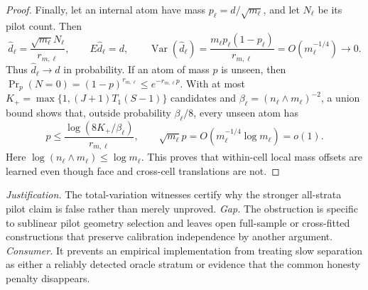 \documentclass{article}
\begin{document}
\begin{proof}
Finally, let an internal atom have mass \(p_\ell=d/\sqrt{m_\ell}\), and let \(N_\ell\) be its pilot count.  Then
\[
 \widehat d_\ell=\frac{\sqrt{m_\ell}N_\ell}{r_{m,\ell}},
 \qquad
 E\widehat d_\ell=d,
 \qquad
 \operatorname{Var}(\widehat d_\ell)
 =\frac{m_\ell p_\ell(1-p_\ell)}{r_{m,\ell}}
 =O(m_\ell^{-1/4})\to0.
\]
Thus \(\widehat d_\ell\to d\) in probability.  If an atom of mass \(p\) is unseen, then
\(\Pr_p(N=0)=(1-p)^{r_{m,\ell}}\leq e^{-r_{m,\ell}p}\).  With at most
\(K_+=\max\{1,(J+1)T_1(S-1)\}\) candidates and
\(\beta_\ell=(n_\ell\wedge m_\ell)^{-2}\), a union bound shows that, outside probability \(\beta_\ell/8\), every unseen atom has
\[
 p\leq\frac{\log(8K_+/\beta_\ell)}{r_{m,\ell}},
 \qquad
 \sqrt{m_\ell}p=O(m_\ell^{-1/4}\log m_\ell)=o(1).
\]
Here \(\log(n_\ell\wedge m_\ell)\leq\log m_\ell\).  This proves that within-cell local mass offsets are learned even though face and cross-cell translations are not.
\end{proof}
\par\smallskip\noindent \textit{Justification.} The total-variation witnesses certify why the stronger all-strata pilot claim is false rather than merely unproved. \textit{Gap.} The obstruction is specific to sublinear pilot geometry selection and leaves open full-sample or cross-fitted constructions that preserve calibration independence by another argument. \textit{Consumer.} It prevents an empirical implementation from treating slow separation as either a reliably detected oracle stratum or evidence that the common honesty penalty disappears.
\end{document}
